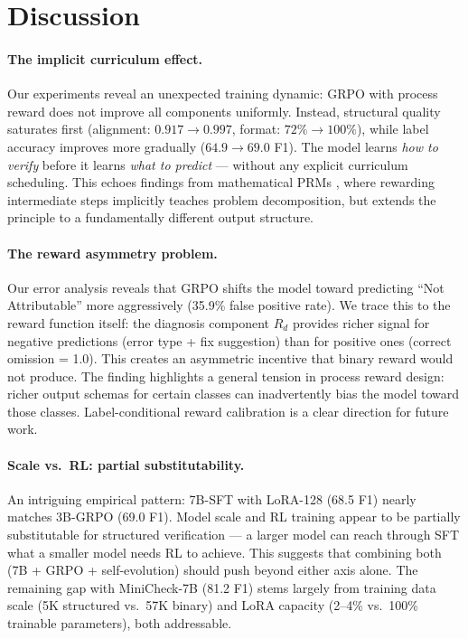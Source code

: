 \documentclass[11pt]{article}
\begin{document}
\FloatBarrier
\section{Discussion}
\label{sec:discussion}

\paragraph{The implicit curriculum effect.}
Our experiments reveal an unexpected training dynamic: GRPO with process reward does not improve all components uniformly.
Instead, structural quality saturates first (alignment: $0.917 \to 0.997$, format: $72\% \to 100\%$), while label accuracy improves more gradually ($64.9 \to 69.0$ F1).
The model learns \emph{how to verify} before it learns \emph{what to predict} --- without any explicit curriculum scheduling.
This echoes findings from mathematical PRMs \citep{lightman2024lets}, where rewarding intermediate steps implicitly teaches problem decomposition, but extends the principle to a fundamentally different output structure.

\paragraph{The reward asymmetry problem.}
Our error analysis reveals that GRPO shifts the model toward predicting ``Not Attributable'' more aggressively (35.9\% false positive rate).
We trace this to the reward function itself: the diagnosis component $R_d$ provides richer signal for negative predictions (error type + fix suggestion) than for positive ones (correct omission = 1.0).
This creates an asymmetric incentive that binary reward would not produce.
The finding highlights a general tension in process reward design: richer output schemas for certain classes can inadvertently bias the model toward those classes.
Label-conditional reward calibration is a clear direction for future work.

\paragraph{Scale vs.\ RL: partial substitutability.}
An intriguing empirical pattern: 7B-SFT with LoRA-128 (68.5 F1) nearly matches 3B-GRPO (69.0 F1).
Model scale and RL training appear to be partially substitutable for structured verification --- a larger model can reach through SFT what a smaller model needs RL to achieve.
This suggests that combining both (7B + GRPO + self-evolution) should push beyond either axis alone.
The remaining gap with MiniCheck-7B (81.2 F1) stems largely from training data scale (5K structured vs.\ 57K binary) and LoRA capacity (2--4\% vs.\ 100\% trainable parameters), both addressable.
\end{document}
